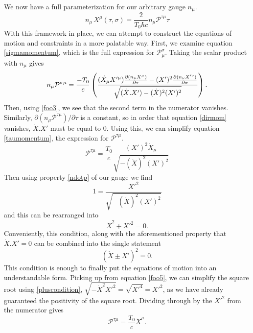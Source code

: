 \documentclass[a4paper,12pt]{article}
\numberwithin{equation}{section}
\begin{document}
We now have a full parameterization for our arbitrary gauge $n_\mu$.
\begin{equation}\label{ngauge}
n_\mu \, X^\mu(\tau, \sigma)  =  \frac{2}{T_0 \hbar c} n_\mu  \mathcal{P}^{\tau \mu} \tau 
\end{equation}
With this framework in place, we can attempt to construct the equations of motion and constraints in a more palatable way. First, we examine equation \ref{sigmamomentum}, which is the full expression for $\mathcal{P}^\sigma_\mu$. Taking the scalar product with $n_\mu$ gives
\begin{equation}{\label{dirmom}}
n_\mu \mathcal{P}^{\sigma \mu} = \frac{-T_0}{c} \left(\frac{(\dot{X}_\mu X'^\mu) \frac{\partial (n_\nu X^\mu)}{\partial \tau} - (X')^2\frac{\partial (n_\nu X'^\nu)}{\partial \sigma}}{\sqrt{(\dot{X}.X') - (\dot{X})^2(X')^2}}\right).
\end{equation}
Then, using \ref{foo3}, we see that the second term in the numerator vanishes. Similarly, $\partial (n_\mu \mathcal{P}^{\tau \mu})/\partial \tau$ is a constant, so in order that equation \ref{dirmom} vanishes, $\dot{X}.X'$ must be equal to $0$. Using this, we can simplify equation \ref{taumomentum}, the expression for $\mathcal{P}^{\tau \mu}$.
\begin{equation}\label{foo5}
\mathcal{P}^{\tau \mu} = \frac{T_0}{c}\frac{(X')^2 \dot{X}_\mu}{\sqrt{-(\dot{X})^2(X')^2}}
\end{equation}
Then using property \ref{ndotp} of our gauge we find
\begin{equation}
1 = \frac{X'^2}{\sqrt{-(\dot{X})^2(X')^2}}
\end{equation}
and this can be rearranged into 
\begin{equation}\label{pluscondition}
\dot{X}^2 + X'^2 = 0.
\end{equation}
Conveniently, this condition, along with the aforementioned property that $\dot{X}.X'=0$ can be combined into the single statement
\begin{equation}\label{constraint}
(\dot{X}\pm X')^2 = 0.
\end{equation}
This condition is enough to finally put the equations of motion into an understandable form. Picking up from equation \ref{foo5}, we can simplify the square root using \ref{pluscondition}, $\sqrt{-\dot{X}^2 X'^2} = \sqrt{X'^4} = X'^2$, as we have already guaranteed the positivity of the square root. Dividing through by the $X'^2$ from the numerator gives 
\begin{equation}\label{taumomentumeom}
\mathcal{P}^{\tau \mu} = \frac{T_0}{c}\dot{X}^\mu.
\end{equation}
\end{document}

